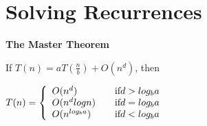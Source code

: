 \chapter{Solving Recurrences}

{\bf The Master Theorem}

If $T(n) = aT(\frac{n}{b}) + O(n^d)$, then

\begin{math}
T(n) = \left\{
\begin{array}{l l}
O(n^d)       & \quad \text{if} d > log_ba \\
O(n^d logn)  & \quad \text{if} d = log_ba \\
O(n^{log_ba}) & \quad \text{if} d < log_ba \\
\end{array} \right.
\end{math}
